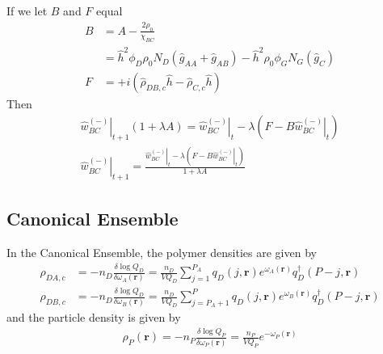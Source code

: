 \documentclass{article}
\begin{document}
  If we let $B$ and $F$ equal
  \begin{align*}
    B &= A - \frac{2\rho_0}{\chi_{BC}} \\
      &=\hat{h}^2 \phi_D \rho_0 N_D
        (\hat{g}_{AA} + \hat{g}_{AB}) 
        -  \hat{h} ^2  {\rho}_0  
          \phi_G N_G (\hat{g}_{C}) 
          \\
    F &= + i ( \hat{\rho}_{DB,c} \hat{h}
              - \hat{\rho}_{C,c} \hat{h} )
  \end{align*}
  Then
  \begin{align*}
    \left. \hat{w}_{BC}^{(-)} \right|_{t+1} ( 1 + \lambda A ) =
      \left. \hat{w}_{BC}^{(-)} \right|_t
      - \lambda \left( F - B \left. \hat{w}_{BC}^{(-)} \right|_t \right) \\
    \left. \hat{w}_{BC}^{(-)} \right|_{t+1} =
    \frac{\left. \hat{w}_{BC}^{(-)} \right|_t - \lambda
            \left( F - B \left. \hat{w}_{BC}^{(-)} \right|_t \right)}
         {1 + \lambda A}
  \end{align*}



    
  
  \subsection{Canonical Ensemble}
  
  In the Canonical Ensemble, the polymer densities are given by
  \begin{align*}
    \rho_{DA,c} &=
      -n_D \frac{\delta \log Q_D}{\delta \omega_A(\mathbf{r})}
      = \frac{n_D}{V Q_D}
      \sum_{j=1}^{P_A}
      q_D(j, \mathbf{r})
      e^{\omega_A(\mathbf{r})}
      q_D^\dagger(P-j, \mathbf{r}) \\
    \rho_{DB,c} &=
      -n_D \frac{\delta \log Q_D}{\delta \omega_B(\mathbf{r})}
      = \frac{n_D}{V Q_D}
      \sum_{j=P_A+1}^{P}
      q_D(j, \mathbf{r})
      e^ {\omega_B(\mathbf{r})}
      q_D^\dagger(P-j, \mathbf{r})
  \end{align*}
  and the particle density is given by
  \begin{align*}
    \rho_P(\mathbf{r}) =
      -n_P \frac{\delta \log Q_P}{\delta \omega_P(\mathbf{r})}
      = \frac{n_P}{V Q_P} e^{-\omega_P(\mathbf{r})}
  \end{align*}
  
  
\end{document}
